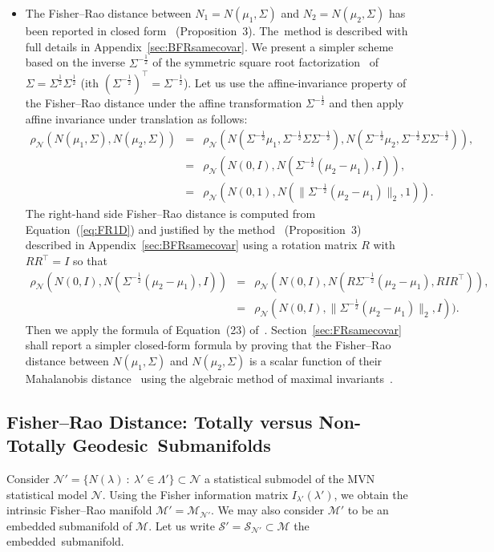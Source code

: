 \documentclass[entropy,article,accept,oneauthor,pdftex,entropy]{Definitions/mdpi}
\def\calS{\mathcal{S}}
\def\calM{\mathcal{M}}
\def\calN{\mathcal{N}}
\def\st{\ :\ }
\begin{document}
\begin{itemize}
\item The Fisher--Rao distance between $N_1=N(\mu_1,\Sigma)$ and $N_2=N(\mu_2,\Sigma)$ has been reported in closed form~\cite{FRMVNReview-2020} (Proposition~3). The~method is described with full details in Appendix~\ref{sec:BFRsamecovar}.
We  present a simpler  scheme based on the inverse $\Sigma^{-\frac{1}{2}}$ of the symmetric square root factorization~\cite{dolcetti2020real} of $\Sigma=\Sigma^{\frac{1}{2}}\Sigma^{\frac{1}{2}}$ (ith $(\Sigma^{-\frac{1}{2}})^\top=\Sigma^{-\frac{1}{2}}$). Let us use the affine-invariance property of the Fisher–Rao distance under the affine transformation $\Sigma^{-\frac{1}{2}}$ and then apply affine invariance under translation as follows:
\begin{eqnarray*}
\rho_\calN(N(\mu_1,\Sigma),N(\mu_2,\Sigma)) &=&
 \rho_\calN(N(\Sigma^{-\frac{1}{2}}\mu_1,\Sigma^{-\frac{1}{2}}\Sigma\Sigma^{-\frac{1}{2}}),N(\Sigma^{-\frac{1}{2}}\mu_2,\Sigma^{-\frac{1}{2}}\Sigma\Sigma^{-\frac{1}{2}})),\\
&=& \rho_\calN(N(0,I),N(\Sigma^{-\frac{1}{2}}(\mu_2-\mu_1),I)),\\
&=& \rho_\calN(N(0,1),N(\|\Sigma^{-\frac{1}{2}}(\mu_2-\mu_1)\|_2,1)).
\end{eqnarray*}
The right-hand side Fisher–Rao distance is computed from Equation~(\ref{eq:FR1D}) and justified by the method~\cite{FRMVNReview-2020} (Proposition~3) described in  Appendix~\ref{sec:BFRsamecovar} using a rotation matrix $R$ with $RR^\top=I$ so that 
\begin{eqnarray*}
\rho_\calN(N(0,I),N(\Sigma^{-\frac{1}{2}}(\mu_2-\mu_1),I))&=&\rho_\calN(N(0,I),N(R \Sigma^{-\frac{1}{2}}(\mu_2-\mu_1),RIR^\top)),\\
&=& \rho_\calN(N(0,I),\|\Sigma^{-\frac{1}{2}}(\mu_2-\mu_1)\|_2,I)).
\end{eqnarray*}
Then we apply the formula of Equation~(23) of~\cite{FRMVNReview-2020}.
Section~\ref{sec:FRsamecovar} shall report a simpler closed-form formula by proving that the Fisher–Rao distance between $N(\mu_1,\Sigma)$ and $N(\mu_2,\Sigma)$ is a scalar function of their Mahalanobis distance~\cite{mahalanobis1936generalised} using the algebraic method of maximal invariants~\cite{eaton1989group}.
\end{itemize}


 

\subsection{Fisher–Rao Distance:  Totally versus Non-Totally Geodesic~Submanifolds}\label{sec:submfd}
Consider $\calN'=\{N(\lambda) \st\lambda'\in\Lambda'\}\subset\calN$ a statistical submodel of the MVN statistical model $\calN$.
Using the Fisher information matrix $I_{\lambda'}(\lambda')$, we obtain the intrinsic Fisher–Rao manifold $\calM'=\calM_{\calN'}$.
We may also consider $\calM'$ to be an embedded submanifold of $\calM$. 
 Let us write $\calS'=\calS_{\calN'}\subset\calM$ the embedded~submanifold.
\end{document}
